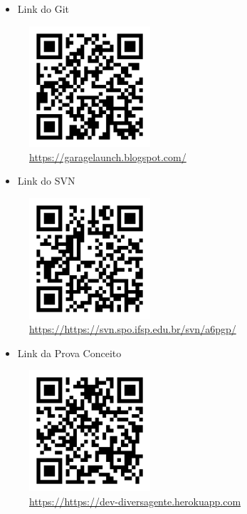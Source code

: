 \begin{itemize}
	\item Link do Git
\end{itemize}
\begin{figure}[htb]
	\includegraphics[width=0.40\textwidth]{anexos/blog.png} \\
	\hyperlink {Link do Blog}{https://garagelaunch.blogspot.com/}
\end{figure}

\newline

\begin{itemize}
	\item Link do SVN
\end{itemize}
\begin{figure}[htb]
	\includegraphics[width=0.40\textwidth]{anexos/svn.png} \\
	\hyperlink {Link do Blog}{https://https://svn.spo.ifsp.edu.br/svn/a6pgp/}
\end{figure}

\pagebreak

\begin{itemize}
	\item Link da Prova Conceito
\end{itemize}
\begin{figure}[htb]
	\includegraphics[width=0.40\textwidth]{anexos/heroku.png} \\
	\hyperlink {Link do Blog}{https://https://dev-diversagente.herokuapp.com}
\end{figure}
